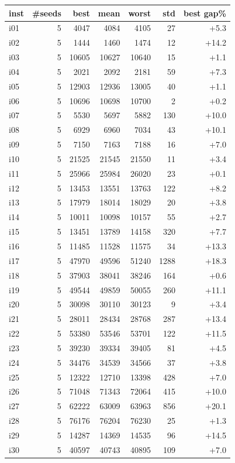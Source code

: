 \begin{center}\small
\begin{tabular}{lrrrrrr}
\toprule
inst & \#seeds & best & mean & worst & std & best gap\%\\
\midrule
i01 & 5 & 4047 & 4084 & 4105 & 27 & +5.3\\
i02 & 5 & 1444 & 1460 & 1474 & 12 & +14.2\\
i03 & 5 & 10605 & 10627 & 10640 & 15 & +1.1\\
i04 & 5 & 2021 & 2092 & 2181 & 59 & +7.3\\
i05 & 5 & 12903 & 12936 & 13005 & 40 & +1.1\\
i06 & 5 & 10696 & 10698 & 10700 & 2 & +0.2\\
i07 & 5 & 5530 & 5697 & 5882 & 130 & +10.0\\
i08 & 5 & 6929 & 6960 & 7034 & 43 & +10.1\\
i09 & 5 & 7150 & 7163 & 7188 & 16 & +7.0\\
i10 & 5 & 21525 & 21545 & 21550 & 11 & +3.4\\
i11 & 5 & 25966 & 25984 & 26020 & 23 & +0.1\\
i12 & 5 & 13453 & 13551 & 13763 & 122 & +8.2\\
i13 & 5 & 17979 & 18014 & 18029 & 20 & +3.8\\
i14 & 5 & 10011 & 10098 & 10157 & 55 & +2.7\\
i15 & 5 & 13451 & 13789 & 14158 & 320 & +7.7\\
i16 & 5 & 11485 & 11528 & 11575 & 34 & +13.3\\
i17 & 5 & 47970 & 49596 & 51240 & 1288 & +18.3\\
i18 & 5 & 37903 & 38041 & 38246 & 164 & +0.6\\
i19 & 5 & 49544 & 49859 & 50055 & 260 & +11.1\\
i20 & 5 & 30098 & 30110 & 30123 & 9 & +3.4\\
i21 & 5 & 28011 & 28434 & 28768 & 287 & +13.4\\
i22 & 5 & 53380 & 53546 & 53701 & 122 & +11.5\\
i23 & 5 & 39230 & 39334 & 39405 & 81 & +4.5\\
i24 & 5 & 34476 & 34539 & 34566 & 37 & +3.8\\
i25 & 5 & 12322 & 12710 & 13398 & 428 & +7.0\\
i26 & 5 & 71048 & 71343 & 72064 & 415 & +10.0\\
i27 & 5 & 62222 & 63009 & 63963 & 856 & +20.1\\
i28 & 5 & 76176 & 76204 & 76230 & 25 & +1.3\\
i29 & 5 & 14287 & 14369 & 14535 & 96 & +14.5\\
i30 & 5 & 40597 & 40743 & 40895 & 109 & +7.0\\
\bottomrule
\end{tabular}
\end{center}
